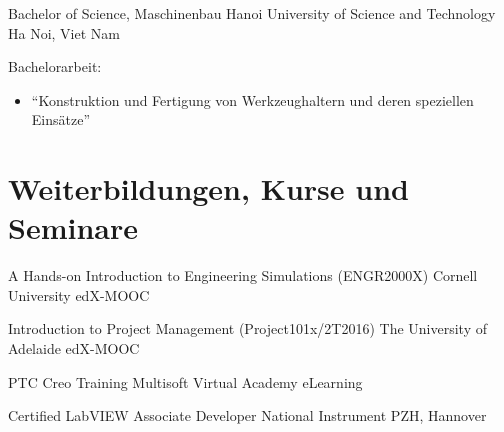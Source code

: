 \documentclass[11pt,a4paper,sans]{moderncv}
\begin{document}
{Bachelor of Science, Maschinenbau}
{Hanoi University of Science and Technology}
{Ha Noi, Viet Nam}
{}
{
    Bachelorarbeit:
    \begin{itemize}
        \item "`Konstruktion und Fertigung von Werkzeughaltern und deren speziellen Einsätze"'
    \end{itemize}
}


\section{\textbf{Weiterbildungen, Kurse und Seminare}}

{A Hands-on Introduction to Engineering Simulations (ENGR2000X)}
{Cornell University}
{edX-MOOC}
{}
{}

{Introduction to Project Management (Project101x/2T2016)}
{The University of Adelaide}
{edX-MOOC}
{}
{}

{PTC Creo Training}
{Multisoft Virtual Academy}
{eLearning}
{}
{}

{Certified LabVIEW Associate Developer}
{National Instrument}
{PZH, Hannover}
{}
{}


\end{document}
